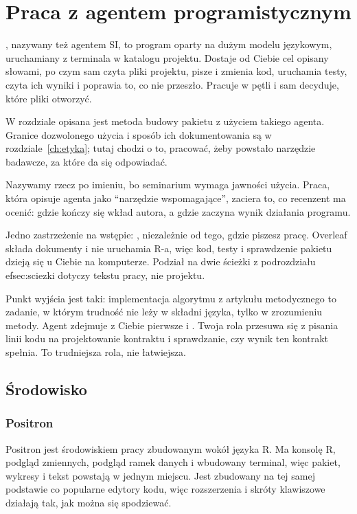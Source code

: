 \chapter{Praca z agentem programistycznym}\label{ch:agent}

, nazywany też agentem SI, to program oparty na dużym modelu językowym, uruchamiany z terminala w katalogu projektu. Dostaje od Ciebie cel opisany słowami, po czym sam czyta pliki projektu, pisze i zmienia kod, uruchamia testy, czyta ich wyniki i poprawia to, co nie przeszło. Pracuje w pętli i sam decyduje, które pliki otworzyć.

W rozdziale opisana jest metoda budowy pakietu z użyciem takiego agenta. Granice dozwolonego użycia i sposób ich dokumentowania są w rozdziale~\ref{ch:etyka}; tutaj chodzi o to,  pracować, żeby powstało narzędzie badawcze, za które da się odpowiadać.

Nazywamy rzecz po imieniu, bo seminarium wymaga jawności użycia. Praca, która opisuje agenta jako \enquote{narzędzie wspomagające}, zaciera to, co recenzent ma ocenić: gdzie kończy się wkład autora, a gdzie zaczyna wynik działania programu.

Jedno zastrzeżenie na wstępie: , niezależnie od tego, gdzie piszesz pracę. Overleaf składa dokumenty i nie uruchamia R-a, więc kod, testy i sprawdzenie pakietu dzieją się u Ciebie na komputerze. Podział na dwie ścieżki z podrozdziału~
ef{sec:sciezki} dotyczy tekstu pracy, nie projektu.

Punkt wyjścia jest taki: implementacja algorytmu z artykułu metodycznego to zadanie, w którym trudność nie leży w składni języka, tylko w zrozumieniu metody. Agent zdejmuje z Ciebie pierwsze i . Twoja rola przesuwa się z pisania linii kodu na projektowanie kontraktu i sprawdzanie, czy wynik ten kontrakt spełnia. To trudniejsza rola, nie łatwiejsza.

\section{Środowisko}

\subsection{Positron}

Positron jest środowiskiem pracy zbudowanym wokół języka R. Ma konsolę R, podgląd zmiennych, podgląd ramek danych i wbudowany terminal, więc pakiet, wykresy i tekst powstają w jednym miejscu. Jest zbudowany na tej samej podstawie co popularne edytory kodu, więc rozszerzenia i skróty klawiszowe działają tak, jak można się spodziewać.

